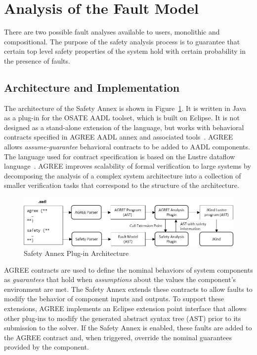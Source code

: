 \section{Analysis of the Fault Model}
\label{sec:fault_analysis}
There are two possible fault analyses available to users, monolithic and compositional. 
The purpose of the safety analysis process is to guarantee that certain top level safety properties of the system hold with certain probability in the presence of faults. 

\subsection{Architecture and Implementation}
\label{sec:implementation}

The architecture of the Safety Annex is shown in Figure~\ref{fig:plugin-arch}.  It is written in Java as a plug-in for the OSATE AADL toolset, which is built on Eclipse.  It is not designed as a stand-alone extension of the language, but works with behavioral contracts specified in AGREE AADL annex and associated tools~\cite{NFM2012:CoGaMiWhLaLu}.  AGREE allows {\em assume-guarantee} behavioral contracts to be added to AADL components.  The language used for contract specification is based on the Lustre dataflow language~\cite{Halbwachs91:IEEE}. AGREE improves scalability of formal verification to large systems by decomposing the analysis of a complex system architecture into a collection of smaller verification tasks that correspond to the structure of the architecture.

\begin{figure}
	\begin{center}
		\includegraphics[width=.9\textwidth]{images/arch.png}
	\end{center}
	\vspace{-0.2in}
	\caption{Safety Annex Plug-in Architecture}
	\label{fig:plugin-arch}
\end{figure}

AGREE contracts are used to define the nominal behaviors of system components as {\em guarantees} that hold when {\em assumptions} about the values the component's environment are met.  The Safety Annex extends these contracts to allow faults to modify the behavior of component inputs and outputs.  To support these extensions, AGREE implements an Eclipse extension point interface that allows other plug-ins to modify the generated abstract syntax tree (AST) prior to its submission to the solver.  If the Safety Annex is enabled, these faults are added to the AGREE contract and, when triggered, override the nominal guarantees provided by the component.  

